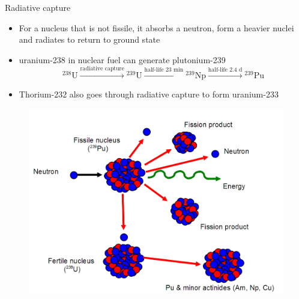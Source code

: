 \documentclass[10pt]{beamer}
\begin{document}
\begin{frame}{Radiative capture}
\begin{itemize}[<+->]
\item For a nucleus that is not fissile, it absorbs a neutron, form a heavier nuclei and radiates to return to ground state
\item uranium-238 in nuclear fuel can generate plutonium-239
\[{}^{238}\text{U} \xrightarrow{\text{radiative capture}} {}^{239}\text{U} \xrightarrow{\text{half-life 23 min}} {}^{239}\text{Np}\xrightarrow{\text{half-life } 2.4 \text{ d}} {}^{239}\text{Pu}\]
\item Thorium-232 also goes through radiative capture to form uranium-233
\end{itemize}
\begin{figure}
\centering
\includegraphics[height=0.5\textheight]{pu}
\end{figure}
\end{frame}
\end{document}
